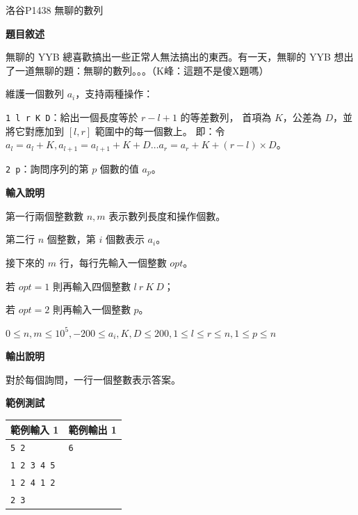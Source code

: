     \problem 洛谷P1438 無聊的數列

    \textbf{題目敘述}

    無聊的 YYB 總喜歡搞出一些正常人無法搞出的東西。有一天，無聊的 YYB 想出了一道無聊的題：無聊的數列。。。（K峰：這題不是傻X題嗎）

    維護一個數列 $a_i$，支持兩種操作：

    \verb|1 l r K D|：給出一個長度等於 $r-l+1$ 的等差數列，
    首項為 $K$，公差為 $D$，並將它對應加到 $[l,r]$ 範圍中的每一個數上。
    即：令 $a_l=a_l+K,a_{l+1}=a_{l+1}+K+D\ldots a_r=a_r+K+(r-l) \times D$。

    \verb|2 p|：詢問序列的第 $p$ 個數的值 $a_p$。

    \textbf{輸入說明}

    第一行兩個整數數 $n,m$ 表示數列長度和操作個數。

    第二行 $n$ 個整數，第 $i$ 個數表示 $a_i$。

    接下來的 $m$ 行，每行先輸入一個整數 $opt$。

    若 $opt=1$ 則再輸入四個整數 $l\ r\ K\ D$；

    若 $opt=2$ 則再輸入一個整數 $p$。

    $0\le n,m \le 10^5,-200\le a_i,K,D\le 200, 1 \leq l \leq r \leq n, 1 \leq p \leq n$

    \textbf{輸出說明}

    對於每個詢問，一行一個整數表示答案。

    \textbf{範例測試}

    \begin{tabular}{|m{7cm}|m{7cm}|}
        \hline
        範例輸入 1 & 範例輸出 1 \\
        \hline
        \verb|5 2|  & \verb|6| \\
        \verb|1 2 3 4 5|  & \\
        \verb|1 2 4 1 2|  & \\
        \verb|2 3|  &\\
        \hline
    \end{tabular}

    